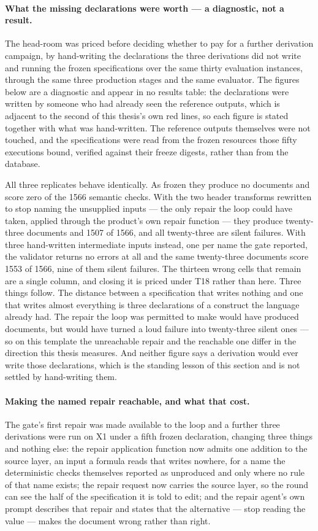 \paragraph{What the missing declarations were worth --- a diagnostic, not a result.}
The head-room was priced before deciding whether to pay for a further derivation campaign, by
hand-writing the declarations the three derivations did not write and running the frozen
specifications over the same thirty evaluation instances, through the same three production
stages and the same evaluator. The figures below are a diagnostic and appear in no results
table: the declarations were written by someone who had already seen the reference outputs,
which is adjacent to the second of this thesis's own red lines, so each figure is stated
together with what was hand-written. The reference outputs themselves were not touched, and
the specifications were read from the frozen resources those fifty executions bound, verified
against their freeze digests, rather than from the database.

All three replicates behave identically. As frozen they produce no documents and score zero of
the 1566 semantic checks. With the two header transforms rewritten to stop naming the
unsupplied inputs --- the only repair the loop could have taken, applied through the product's
own repair function --- they produce twenty-three documents and 1507 of 1566, and all
twenty-three are silent failures. With three hand-written intermediate inputs instead, one per
name the gate reported, the validator returns no errors at all and the same twenty-three
documents score 1553 of 1566, nine of them silent failures. The thirteen wrong cells that
remain are a single column, and closing it is priced under T18 rather than here. Three things
follow. The distance between a specification that writes nothing and one that writes almost
everything is three declarations of a construct the language already had. The repair the loop
was permitted to make would have produced documents, but would have turned a loud failure into
twenty-three silent ones --- so on this template the unreachable repair and the reachable one
differ in the direction this thesis measures. And neither figure says a derivation would ever
write those declarations, which is the standing lesson of this section and is not settled by
hand-writing them.

\paragraph{Making the named repair reachable, and what that cost.}
The gate's first repair was made available to the loop and a further three derivations were
run on X1 under a fifth frozen declaration, changing three things and nothing else: the
repair application function now admits one addition to the source layer, an input a formula
reads that writes nowhere, for a name the deterministic checks themselves reported as
unproduced and only where no rule of that name exists; the repair request now carries the
source layer, so the round can see the half of the specification it is told to edit; and the
repair agent's own prompt describes that repair and states that the alternative --- stop
reading the value --- makes the document wrong rather than right.


